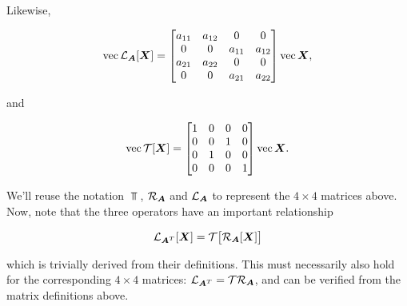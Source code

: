 \documentclass[useAMS,usenatbib]{mn2e}
\newcommand{\mat}[1]{{\bmath{#1}}}
\begin{document}
Likewise, 

\begin{equation}
\VEC{\Lop{\mat{A}}[\mat{X}]} = 
\Matrix{cccc}{a_{11}&a_{12}&0&0 \\ 0&0&a_{11}&a_{12} \\ a_{21}&a_{22}&0&0  \\ 0&0&a_{21}&a_{22} }
\VEC{\mat{X}},
\end{equation}

and

\begin{equation}
\VEC{\Top[\mat{X}]} = 
\Matrix{cccc}{1&0&0&0 \\ 0&0&1&0 \\ 0&1&0&0 \\ 0&0&0&1} \VEC{\mat{X}}.
\end{equation}


We'll reuse the notation $\Top$, $\Rop{\mat{A}}$ and $\Lop{\mat{A}}$ to represent the $4\times4$ matrices above. Now, note that the
three operators have an important relationship

\begin{equation}
\Lop{\mat{A}^T}[\mat{X}] = \Top \big[ \Rop{\mat{A}}[\mat{X}] \big ]
\end{equation}

which is trivially derived from their definitions. This must necessarily also hold for the corresponding $4\times4$ matrices:
$\Lop{\mat{A}^T} = \Top \Rop{\mat{A}}$, and can be verified from the matrix definitions above.

\label{lastpage}
\end{document}
